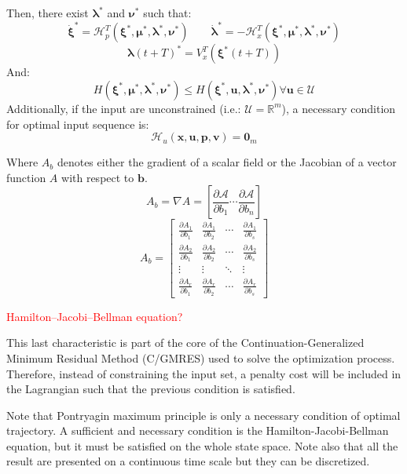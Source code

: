 \documentclass[a4paper, 12pt]{report}
\begin{document}
Then, there exist $\boldsymbol{\lambda}^*$ and $\boldsymbol{\nu}^*$ such that:
\[ \boldsymbol{\dot \xi}^* = \mathcal{H}_p^T (\boldsymbol{\xi}^*, \boldsymbol{\mu}^*, \boldsymbol{\lambda}^*, \boldsymbol{\nu}^*)  \qquad \boldsymbol{\dot \lambda}^*  = -\mathcal{H}_x^T (\boldsymbol{\xi}^*, \boldsymbol{\mu}^*, \boldsymbol{\lambda}^*, \boldsymbol{\nu}^*)\]
\[ \boldsymbol{\lambda}(t+T)^* = V_x^T(\boldsymbol{\xi}^*(t+T)) \]
And:
\[ H(\boldsymbol{\xi}^*, \boldsymbol{\mu}^*, \boldsymbol{\lambda}^*, \boldsymbol{\nu}^*) \leq H(\boldsymbol{\xi}^*, \boldsymbol{u}, \boldsymbol{\lambda}^*, \boldsymbol{\nu}^*) \forall \boldsymbol{u} \in \mathcal{U} \]
Additionally, if the input are unconstrained (i.e.: $\mathcal{U}=\mathbb{R}^m$), a necessary condition for optimal input sequence is:
\[ \mathcal{H}_u (\boldsymbol{x}, \boldsymbol{u}, \boldsymbol{p}, \boldsymbol{v}) = \boldsymbol{0}_m \]

Where $A_b$ denotes either the gradient of a scalar field or the Jacobian of a vector function $A$ with respect to $\boldsymbol{b}$.
\[ A_b = \nabla A = \left [ \frac{\partial \mathcal{A}}{\partial b_1} \cdots \frac{\partial \mathcal{A}}{\partial b_n} \right ] \]
\[ A_b =  \begin{bmatrix} \frac{\partial A_1}{\partial b_1} & \frac{\partial A_1}{\partial b_2} & \cdots & \frac{\partial A_1}{\partial b_s}  \\ 
 \frac{\partial A_2}{\partial b_1} &  \frac{\partial A_2}{\partial b_2} & \cdots & \frac{\partial A_2}{\partial b_s}  \\ 
 \vdots &  \vdots & \ddots & \vdots  \\ 
 \frac{\partial A_r}{\partial b_1} &  \frac{\partial A_r}{\partial b_2} & \cdots & \frac{\partial A_r}{\partial b_s} \end{bmatrix}  \]
 
 \textcolor{red}{Hamilton–Jacobi–Bellman equation?}

This last characteristic is part of the core of the Continuation-Generalized Minimum Residual Method (C/GMRES)\cite{Ohtsuka2004} used to solve the optimization process. Therefore, instead of constraining the input set, a penalty cost will be included in the Lagrangian such that the previous condition is satisfied.

Note that Pontryagin maximum principle is only a necessary condition of optimal trajectory. A sufficient and necessary condition is the Hamilton-Jacobi-Bellman equation, but it must be satisfied on the whole state space. Note also that all the result are presented on a continuous time scale but they can be discretized.
\end{document}

